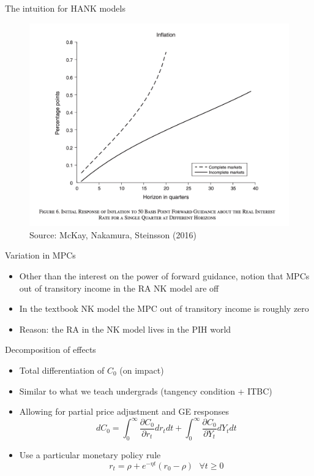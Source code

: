 \documentclass[english,xcolor=svgnames]{beamer}
\begin{document}
\begin{frame}{The intuition for HANK models}
\begin{figure}
\includegraphics[scale=0.35]{figures/mns_5}\\
Source: McKay, Nakamura, Steinsson (2016)
\end{figure}
\end{frame}


\begin{frame}{Variation in MPCs}
\begin{itemize}
\item Other than the interest on the power of forward guidance, notion that MPCs out of transitory income in the RA NK model are off
\item In the textbook NK model the MPC out of transitory income is roughly zero
\item Reason: the RA in the NK model lives in the PIH world
\end{itemize}
\end{frame}

\begin{frame}{Decomposition of effects}
\begin{itemize}
\item Total differentiation of $C_0$ (on impact)
\item Similar to what we teach undergrads (tangency condition + ITBC)
\item Allowing for partial price adjustment and GE responses
\[d C_0 = \int_0^{\infty} \frac{\partial C_0}{\partial r_t} dr_t dt + \int_0^{\infty} \frac{\partial C_0}{\partial Y_t} d Y_t dt\]
\item Use a particular monetary policy rule
\[r_t  = \rho  + e^{-\eta t} (r_0 - \rho) \text{   } \forall t \geq 0 \] 
\end{itemize}
\end{frame}
\end{document}
